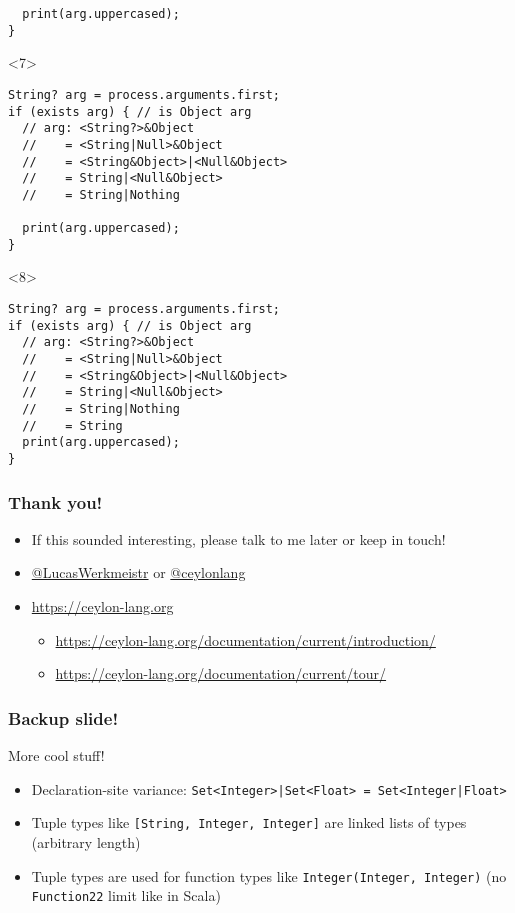 \documentclass[aspectratio=169]{beamer}
\makeatletter
\newcommand{\TwitterUsername}[1]{\href{https://twitter.com/#1}{\ttfamily @#1}}
\makeatother
\begin{document}
\begin{frame}[fragile]
\begin{onlyenv}
\begin{lstlisting}
  print(arg.uppercased);
}
    \end{lstlisting}
  \end{onlyenv}
  \begin{onlyenv}<7>
    \begin{lstlisting}
String? arg = process.arguments.first;
if (exists arg) { // is Object arg
  // arg: <String?>&Object
  //    = <String|Null>&Object
  //    = <String&Object>|<Null&Object>
  //    = String|<Null&Object>
  //    = String|Nothing

  print(arg.uppercased);
}
    \end{lstlisting}
  \end{onlyenv}
  \begin{onlyenv}<8>
    \begin{lstlisting}
String? arg = process.arguments.first;
if (exists arg) { // is Object arg
  // arg: <String?>&Object
  //    = <String|Null>&Object
  //    = <String&Object>|<Null&Object>
  //    = String|<Null&Object>
  //    = String|Nothing
  //    = String
  print(arg.uppercased);
}
    \end{lstlisting}
  \end{onlyenv}
\end{frame}

\begin{frame}
  \frametitle{Thank you!}
  \begin{itemize}
  \item If this sounded interesting, please talk to me later or keep in touch!
  \item \TwitterUsername{LucasWerkmeistr} or \TwitterUsername{ceylonlang}
  \item \url{https://ceylon-lang.org}
    \begin{itemize}
    \item \url{https://ceylon-lang.org/documentation/current/introduction/}
    \item \url{https://ceylon-lang.org/documentation/current/tour/}
    \end{itemize}
  \end{itemize}
\end{frame}

\begin{frame}
  \frametitle{Backup slide!}
  More cool stuff!
  \begin{itemize}
  \item Declaration-site variance: \lstinline{Set<Integer>|Set<Float> = Set<Integer|Float>}
  \item Tuple types like \lstinline{[String, Integer, Integer]} are linked lists of types (arbitrary length)
  \item Tuple types are used for function types like \lstinline{Integer(Integer, Integer)} (no \lstinline{Function22} limit like in Scala)
  \end{itemize}
\end{frame}
\end{document}
